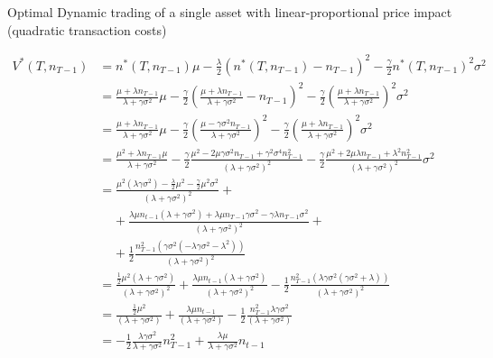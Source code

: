 \documentclass[10pt]{article}
\newenvironment{exercise}[2][Exercise]{\begin{trivlist}
  \item[\hskip \labelsep {\bfseries #1}\hskip \labelsep {\bfseries #2.}]}{\end{trivlist}}
\begin{document}
\begin{exercise}{3}{Optimal Dynamic trading of a single asset with linear-proportional price impact (quadratic transaction costs)}
\begin{itemize}
  \begin{align*}
    V^*(T, n_{T-1}) &= n^*(T, n_{T-1})\mu - \frac \lambda 2 \left(n^*(T, n_{T - 1}) -
    n_{T-1}\right)^2 - \frac \gamma 2 n^*(T, n_{T-1})^2 \sigma^2 \\
    &= \frac{\mu + \lambda n_{T-1}}{\lambda + \gamma \sigma^2}\mu - \frac \gamma
      2 \left( \frac{\mu + \lambda n_{T-1}}{\lambda + \gamma \sigma^2} - n_{T-1}\right)^2 - \frac
      \gamma 2 \left(\frac{\mu + \lambda n_{T-1}}{\lambda + \gamma \sigma^2} \right) ^2
      \sigma^2 \\
    &= \frac{\mu + \lambda n_{T-1}}{\lambda + \gamma \sigma^2}\mu - \frac \gamma
      2 \left( \frac{\mu - \gamma\sigma^2n_{T-1}}{\lambda + \gamma \sigma^2}\right)^2 - \frac
      \gamma 2 \left(\frac{\mu + \lambda n_{T-1}}{\lambda + \gamma \sigma^2} \right) ^2
      \sigma^2 \\
    &= \frac{\mu^2 + \lambda n_{T-1} \mu}{\lambda + \gamma \sigma^2} - \frac \gamma
      2 \frac{\mu^2 - 2\mu\gamma\sigma^2n_{T-1} + \gamma^2\sigma^4n_{T-1}^2}{(\lambda + \gamma \sigma^2)^2} - \frac
      \gamma 2 \frac{\mu^2 + 2\mu\lambda n_{T-1} + \lambda^2 n_{T-1}^2}{(\lambda + \gamma \sigma^2)^2}
      \sigma^2 \\
    &= \frac{\mu^2(\lambda \gamma\sigma^2) - \frac\lambda 2 \mu^2 - \frac \gamma
      2 \mu^2\sigma^2}{(\lambda  + \gamma\sigma^2)^2} + \\
      & \;\;\;\; + \frac{\lambda\mu n_{t-1} (\lambda + \gamma \sigma^2) +
        \lambda\mu n_{T-1}\gamma \sigma^2 - \gamma \lambda
        n_{T-1}\sigma^2}{(\lambda + \gamma \sigma ^2)^2} +  \\
        & \;\;\;\; + \frac 1 2 \frac{n_{T-1}^2 (\gamma \sigma ^2 ( - \lambda \gamma
          \sigma^2 - \lambda ^ 2))}{(\lambda + \gamma \sigma^2)^2}\\
    &= \frac{\frac 1 2 \mu^2 (\lambda + \gamma \sigma^2)}{(\lambda  + \gamma\sigma^2)^2} 
       + \frac{\lambda\mu n_{t-1} (\lambda + \gamma \sigma^2)} {(\lambda + \gamma \sigma ^2)^2}  
         - \frac 1 2 \frac{n_{T-1}^2 (\lambda \gamma \sigma ^2 ( \gamma
          \sigma^2 + \lambda))}{(\lambda + \gamma \sigma^2)^2}\\
    &= \frac{\frac 1 2 \mu^2}{(\lambda  + \gamma\sigma^2)} 
       + \frac{\lambda\mu n_{t-1}} {(\lambda + \gamma \sigma ^2)} 
         - \frac 1 2 \frac{n_{T-1}^2 \lambda \gamma \sigma ^2}{(\lambda + \gamma \sigma^2)}\\
         &= - \frac 1 2 \frac{ \lambda \gamma \sigma ^2}{\lambda + \gamma
           \sigma^2} n_{T-1}^2 
        + \frac{\lambda\mu }{\lambda + \gamma \sigma ^2}n_{t-1}

\end{align*}
\end{itemize}
\end{exercise}
\end{document}
